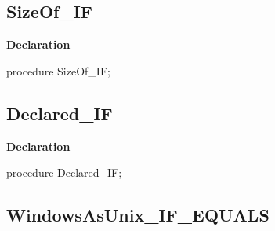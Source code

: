 \documentclass{report}
\newif\ifpdf
\begin{document}
\subsection*{SizeOf{\_}IF}
\fi
\label{ok_if_expressions-SizeOf_IF}
\begin{list}{}{
\setlength{\itemindent}{0cm}
\setlength{\listparindent}{0cm}
\setlength{\leftmargin}{\evensidemargin}
\addtolength{\leftmargin}{\tmplength}
\settowidth{\labelsep}{X}
\addtolength{\leftmargin}{\labelsep}
\setlength{\labelwidth}{\tmplength}
}
\item[\textbf{Declaration}\hfill]
\ifpdf
\begin{flushleft}
\fi
\begin{ttfamily}
procedure SizeOf{\_}IF;\end{ttfamily}

\ifpdf
\end{flushleft}
\fi

\end{list}
\ifpdf
\subsection*{\large{\textbf{Declared{\_}IF}}\normalsize\hspace{1ex}\hrulefill}
\else
\subsection*{Declared{\_}IF}
\fi
\label{ok_if_expressions-Declared_IF}
\begin{list}{}{
\setlength{\itemindent}{0cm}
\setlength{\listparindent}{0cm}
\setlength{\leftmargin}{\evensidemargin}
\addtolength{\leftmargin}{\tmplength}
\settowidth{\labelsep}{X}
\addtolength{\leftmargin}{\labelsep}
\setlength{\labelwidth}{\tmplength}
}
\item[\textbf{Declaration}\hfill]
\ifpdf
\begin{flushleft}
\fi
\begin{ttfamily}
procedure Declared{\_}IF;\end{ttfamily}

\ifpdf
\end{flushleft}
\fi

\end{list}
\ifpdf
\subsection*{\large{\textbf{WindowsAsUnix{\_}IF{\_}EQUALS}}\normalsize\hspace{1ex}\hrulefill}
\else
\end{document}
